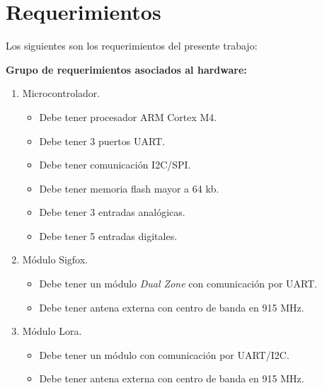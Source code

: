 \section{Requerimientos}
Los siguientes son los requerimientos del presente trabajo:

\textbf{Grupo de requerimientos asociados al hardware:}
\begin{enumerate}

	\item Microcontrolador.

	\begin{itemize}

		\item Debe tener procesador ARM Cortex M4.

		\item Debe tener 3 puertos UART.

		\item Debe tener comunicación I2C/SPI.

		\item Debe tener memoria flash mayor a 64 kb.

		\item Debe tener 3 entradas analógicas.

		\item Debe tener 5 entradas digitales.

	\end{itemize}


	\item Módulo Sigfox.

		\begin{itemize}

			\item Debe tener un módulo \textit{Dual Zone} con comunicación por UART.

			\item Debe tener antena externa con centro de banda en 915 MHz.

		\end{itemize}

	\item Módulo Lora.

		\begin{itemize}

			\item Debe tener un módulo con comunicación por UART/I2C.

			\item Debe tener antena externa con centro de banda en 915 MHz.


\end{itemize}
\end{enumerate}
